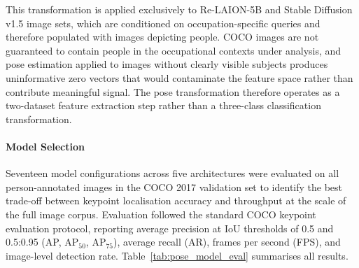 This transformation is applied exclusively to Re-LAION-5B and Stable 
Diffusion v1.5 image sets, which are conditioned on occupation-specific 
queries and therefore populated with images depicting people. COCO images 
are not guaranteed to contain people in the occupational contexts under 
analysis, and pose estimation applied to images without clearly visible 
subjects produces uninformative zero vectors that would contaminate the 
feature space rather than contribute meaningful signal. The pose 
transformation therefore operates as a two-dataset feature extraction step 
rather than a three-class classification transformation.

\paragraph{Model Selection}
Seventeen model configurations across five architectures were evaluated on 
all person-annotated images in the COCO 2017 validation set 
\cite{Lin_2014_COCO} to identify the best trade-off between keypoint 
localisation accuracy and throughput at the scale of the full image corpus. 
Evaluation followed the standard COCO keypoint evaluation protocol, 
reporting average precision at IoU thresholds of 0.5 and 0.5:0.95 
(AP, AP$_{50}$, AP$_{75}$), average recall (AR), frames per second (FPS), 
and image-level detection rate. Table~\ref{tab:pose_model_eval} summarises 
all results.


